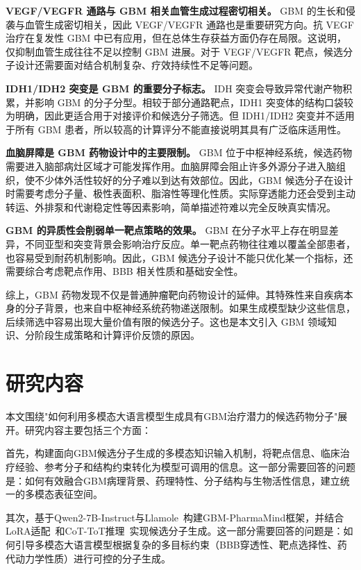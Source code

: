 \textbf{VEGF/VEGFR 通路与 GBM 相关血管生成过程密切相关。} GBM 的生长和侵袭与血管生成密切相关，因此 VEGF/VEGFR 通路也是重要研究方向。抗 VEGF 治疗在复发性 GBM 中已有应用，但在总体生存获益方面仍存在局限。这说明，仅抑制血管生成往往不足以控制 GBM 进展。对于 VEGF/VEGFR 靶点，候选分子设计还需要面对结合机制复杂、疗效持续性不足等问题。

\textbf{IDH1/IDH2 突变是 GBM 的重要分子标志。} IDH 突变会导致异常代谢产物积累，并影响 GBM 的分子分型。相较于部分通路靶点，IDH1 突变体的结构口袋较为明确，因此更适合用于对接评价和候选分子筛选。但 IDH1/IDH2 突变并不适用于所有 GBM 患者，所以较高的计算评分不能直接说明其具有广泛临床适用性。

\textbf{血脑屏障是 GBM 药物设计中的主要限制。} GBM 位于中枢神经系统，候选药物需要进入脑部病灶区域才可能发挥作用。血脑屏障会阻止许多外源分子进入脑组织，使不少体外活性较好的分子难以到达有效部位。因此，GBM 候选分子在设计时需要考虑分子量、极性表面积、脂溶性等理化性质。实际穿透能力还会受到主动转运、外排泵和代谢稳定性等因素影响，简单描述符难以完全反映真实情况。

\textbf{GBM 的异质性会削弱单一靶点策略的效果。} GBM 在分子水平上存在明显差异，不同亚型和突变背景会影响治疗反应。单一靶点药物往往难以覆盖全部患者，也容易受到耐药机制影响。因此，GBM 候选分子设计不能只优化某一个指标，还需要综合考虑靶点作用、BBB 相关性质和基础安全性。

综上，GBM 药物发现不仅是普通肿瘤靶向药物设计的延伸。其特殊性来自疾病本身的分子背景，也来自中枢神经系统药物递送限制。如果生成模型缺少这些信息，后续筛选中容易出现大量价值有限的候选分子。这也是本文引入 GBM 领域知识、分阶段生成策略和计算评价反馈的原因。


\section{研究内容}\label{sec:research-content}

本文围绕"如何利用多模态大语言模型生成具有GBM治疗潜力的候选药物分子"展开。研究内容主要包括三个方面：

首先，构建面向GBM候选分子生成的多模态知识输入机制，将靶点信息、临床治疗经验、参考分子和结构约束转化为模型可调用的信息。这一部分需要回答的问题是：如何有效融合GBM病理背景、药理特性、分子结构与生物活性信息，建立统一的多模态表征空间。

其次，基于Qwen2-7B-Instruct与Llamole~\cite{liu2025multimodal}构建GBM-PharmaMind框架，并结合LoRA适配~\cite{hu2022lora}和CoT-ToT推理~\cite{Wei2022,Yao2023}实现候选分子生成。这一部分需要回答的问题是：如何引导多模态大语言模型根据复杂的多目标约束（BBB穿透性、靶点选择性、药代动力学性质）进行可控的分子生成。

